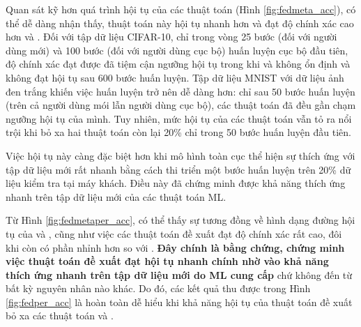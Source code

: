 Quan sát kỹ hơn quá trình hội tụ của các thuật toán  (Hình \ref{fig:fedmeta_acc}), có thể dễ dàng nhận thấy, thuật toán này hội tụ nhanh hơn và đạt độ chính xác cao hơn  và . Đối với tập dữ liệu CIFAR-10, chỉ trong vòng 25 bước (đối với người dùng mới) và 100 bước (đối với người dùng cục bộ) huấn luyện cục bộ đầu tiên, độ chính xác đạt được đã tiệm cận ngưỡng hội tụ trong khi  và  không ổn định và không đạt hội tụ sau 600 bước huấn luyện. Tập dữ liệu MNIST với dữ liệu ảnh đen trắng khiến việc huấn luyện trở nên dễ dàng hơn: chỉ sau 50 bước huấn luyện (trên cả người dùng mói lẫn người dùng cục bộ), các thuật toán đã đều gần chạm ngưỡng hội tụ của mình. Tuy nhiên, mức hội tụ của các thuật toán  vẫn tỏ ra nổi trội khi bỏ xa hai thuật toán còn lại 20\% chỉ trong 50 bước huấn luyện đầu tiên.

Việc hội tụ này càng đặc biệt hơn khi mô hình toàn cục thể hiện sự thích ứng với tập dữ liệu mới rất nhanh bằng cách thi triển một bước huấn luyện trên 20\% dữ liệu kiểm tra tại máy khách. Điều này đã chứng minh được khả năng thích ứng nhanh trên tập dữ liệu mới của các thuật toán ML.

Từ Hình \ref{fig:fedmetaper_acc}, có thể thấy sự tương đồng về hình dạng đường hội tụ của  và , cũng như việc các thuật toán đề xuất đạt độ chính xác rất cao, đôi khi còn có phần nhỉnh hơn so với . \textbf{Đây chính là bằng chứng, chứng minh việc thuật toán đề xuất đạt hội tụ nhanh chính nhờ vào khả năng thích ứng nhanh trên tập dữ liệu mới do ML cung cấp} chứ không đến từ bất kỳ nguyên nhân nào khác. Do đó, các kết quả thu được trong Hình \ref{fig:fedper_acc} là hoàn toàn dễ hiểu khi khả năng hội tụ của thuật toán đề xuất bỏ xa các thuật toán  và .

